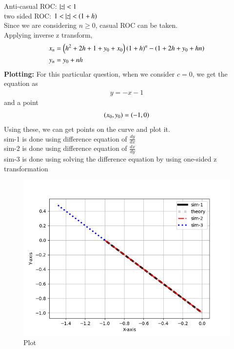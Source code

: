 \documentclass[journal]{IEEEtran}
\begin{document}
Anti-casual ROC: $\left\vert z\right\vert<1$\\
two sided ROC: $1<\left\vert z\right\vert<\left(1+h\right)$\\
Since we are considering $n\geq 0$, casual ROC can be taken.\\
Applying inverse z transform, 
\begin{align}
x_n&=\left(h^2+2h+1+y_0+x_0\right)\left(1+h\right)^n-\left(1+2h+y_0+hn\right)\\
y_n&=y_0+nh
\end{align}
\textbf{Plotting:}
For this particular question, when we consider $c=0$, we get the equation as 
\begin{align}
y=-x-1
\end{align}
and a point \\
\begin{align}
\left(x_0,y_0\right) = \left(-1,0\right)
\end{align}
Using these, we can get points on the curve and plot it.\\
sim-1 is done using difference equation of $\frac{dy}{dx}$\\
sim-2 is done using difference equation of $\frac{dx}{dy}$\\
sim-3 is done using solving the difference equation by using one-sided z transformation
\begin{figure}[h!]
   \centering
   \includegraphics[width=1\columnwidth]{Figs/Figure_1.png}
   \caption{Plot}
\end{figure}
\end{document}
